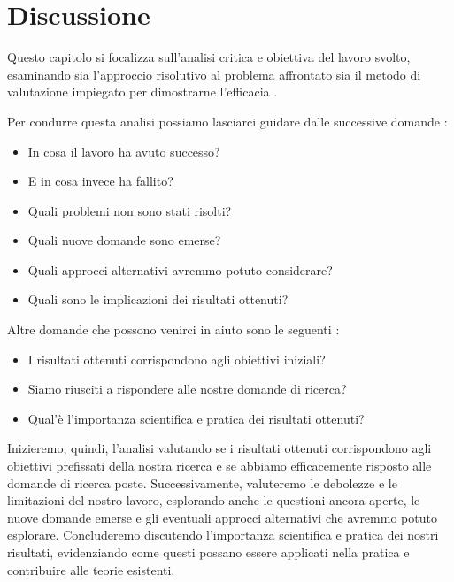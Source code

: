 \chapter{Discussione}
\label{chap:discussione}

\acresetall

Questo capitolo si focalizza sull'analisi critica e obiettiva del lavoro svolto, esaminando sia l'approccio risolutivo al problema affrontato sia il metodo di valutazione impiegato per dimostrarne l'efficacia \cite{pfandzelter2022thesis}. 

\medskip

Per condurre questa analisi possiamo lasciarci guidare dalle successive domande  \cite{zobel2015writing}:
\begin{itemize}
\item In cosa il lavoro ha avuto successo?
\item E in cosa invece ha fallito?
\item Quali problemi non sono stati risolti?
\item Quali nuove domande sono emerse?
\item Quali approcci alternativi avremmo potuto considerare?
\item Quali sono le implicazioni dei risultati ottenuti?
\end{itemize}

\medskip

Altre domande che possono venirci in aiuto sono le seguenti \cite{tuni2019guide}:
\begin{itemize}
\item I risultati ottenuti corrispondono agli obiettivi iniziali? 
\item Siamo riusciti a rispondere alle nostre domande di ricerca?
\item Qual'è l'importanza scientifica e pratica dei risultati ottenuti?
\end{itemize}

\medskip

Inizieremo, quindi, l'analisi valutando se i risultati ottenuti corrispondono agli obiettivi prefissati della nostra ricerca e se abbiamo efficacemente risposto alle domande di ricerca poste. Successivamente, valuteremo le debolezze e le limitazioni del nostro lavoro, esplorando anche le questioni ancora aperte, le nuove domande emerse e gli eventuali approcci alternativi che avremmo potuto esplorare. Concluderemo discutendo l'importanza scientifica e pratica dei nostri risultati, evidenziando come questi possano essere applicati nella pratica e contribuire alle teorie esistenti.

